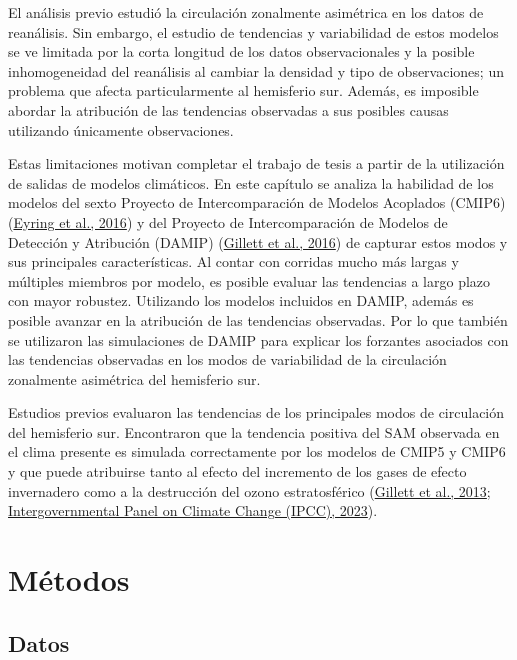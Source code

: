 \documentclass[12pt,oneside,a4paper]{reedthesis}
\begin{document}
El análisis previo estudió la circulación zonalmente asimétrica en los datos de reanálisis.
Sin embargo, el estudio de tendencias y variabilidad de estos modelos se ve limitada por la corta longitud de los datos observacionales y la posible inhomogeneidad del reanálisis al cambiar la densidad y tipo de observaciones; un problema que afecta particularmente al hemisferio sur.
Además, es imposible abordar la atribución de las tendencias observadas a sus posibles causas utilizando únicamente observaciones.

Estas limitaciones motivan completar el trabajo de tesis a partir de la utilización de salidas de modelos climáticos.
En este capítulo se analiza la habilidad de los modelos del sexto Proyecto de Intercomparación de Modelos Acoplados (CMIP6) (\protect\hyperlink{ref-eyring2016}{Eyring et al., 2016}) y del Proyecto de Intercomparación de Modelos de Detección y Atribución (DAMIP) (\protect\hyperlink{ref-gillett2016}{Gillett et al., 2016}) de capturar estos modos y sus principales características.
Al contar con corridas mucho más largas y múltiples miembros por modelo, es posible evaluar las tendencias a largo plazo con mayor robustez.
Utilizando los modelos incluidos en DAMIP, además es posible avanzar en la atribución de las tendencias observadas.
Por lo que también se utilizaron las simulaciones de DAMIP para explicar los forzantes asociados con las tendencias observadas en los modos de variabilidad de la circulación zonalmente asimétrica del hemisferio sur.

Estudios previos evaluaron las tendencias de los principales modos de circulación del hemisferio sur.
Encontraron que la tendencia positiva del SAM observada en el clima presente es simulada correctamente por los modelos de CMIP5 y CMIP6 y que puede atribuirse tanto al efecto del incremento de los gases de efecto invernadero como a la destrucción del ozono estratosférico (\protect\hyperlink{ref-gillett2013}{Gillett et al., 2013}; \protect\hyperlink{ref-ipcc6ch3}{Intergovernmental Panel on Climate Change (IPCC), 2023}).

\hypertarget{muxe9todos-2}{%
\section{Métodos}\label{muxe9todos-2}}

\hypertarget{datos-3}{%
\subsection{Datos}\label{datos-3}}
\end{document}
